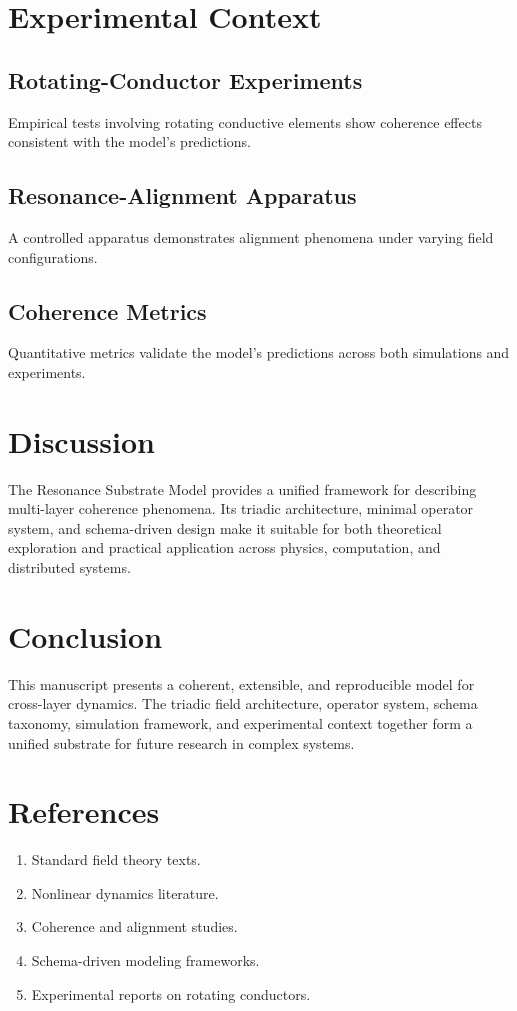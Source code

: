 \documentclass[12pt]{article}
\begin{document}
\section{Experimental Context}

\subsection{Rotating-Conductor Experiments}
Empirical tests involving rotating conductive elements show coherence effects consistent with the model's predictions.

\subsection{Resonance-Alignment Apparatus}
A controlled apparatus demonstrates alignment phenomena under varying field configurations.

\subsection{Coherence Metrics}
Quantitative metrics validate the model's predictions across both simulations and experiments.

\section{Discussion}

The Resonance Substrate Model provides a unified framework for describing multi-layer coherence phenomena. Its triadic architecture, minimal operator system, and schema-driven design make it suitable for both theoretical exploration and practical application across physics, computation, and distributed systems.

\section{Conclusion}

This manuscript presents a coherent, extensible, and reproducible model for cross-layer dynamics. The triadic field architecture, operator system, schema taxonomy, simulation framework, and experimental context together form a unified substrate for future research in complex systems.

\section*{References}

\begin{enumerate}
    \item Standard field theory texts.
    \item Nonlinear dynamics literature.
    \item Coherence and alignment studies.
    \item Schema-driven modeling frameworks.
    \item Experimental reports on rotating conductors.
\end{enumerate}
\end{document}
